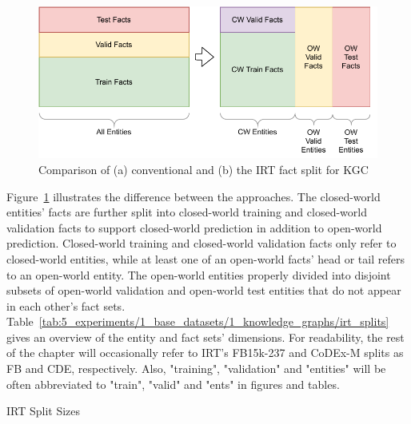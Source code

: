 \begin{figure}
    \centering
    \includegraphics[width=\textwidth]{5_experiments/1_base_datasets/1_knowledge_graphs/irt_split}
    \caption{Comparison of (a) conventional and (b) the IRT fact split for KGC}
    \label{fig:5_experiments/1_base_datasets/1_knowledge_graphs/irt_split}
\end{figure}

Figure~\ref{fig:5_experiments/1_base_datasets/1_knowledge_graphs/irt_split} illustrates the difference between the approaches. The closed-world entities' facts are further split into closed-world training and closed-world validation facts to support closed-world prediction in addition to open-world prediction. Closed-world training and closed-world validation facts only refer to closed-world entities, while at least one of an open-world facts' head or tail refers to an open-world entity. The open-world entities properly divided into disjoint subsets of open-world validation and open-world test entities that do not appear in each other's fact sets. Table~\ref{tab:5_experiments/1_base_datasets/1_knowledge_graphs/irt_splits} gives an overview of the entity and fact sets' dimensions. For readability, the rest of the chapter will occasionally refer to IRT's FB15k-237 and CoDEx-M splits as FB and CDE, respectively. Also, "training", "validation" and "entities" will be often abbreviated to "train", "valid" and "ents" in figures and tables.

\begin{table}[h]
    \centering
    
    \caption{IRT Split Sizes}
    \label{tab:5_experiments/1_base_datasets/1_knowledge_graphs/irt_splits}
\end{table}
